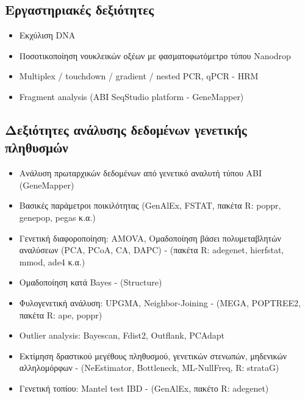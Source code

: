\documentclass[12pt,]{scrartcl}
\begin{document}

\subsection{Εργαστηριακές δεξιότητες}\label{lab}
\begin{itemize}
\vspace{-3mm}
\setlength\itemsep{-0.6em}
\item Εκχύλιση DNA%
\item Ποσοτικοποίηση νουκλεικών οξέων με φασματοφωτόμετρο τύπου Nanodrop
\item Multiplex / touchdown / gradient / nested PCR, qPCR - HRM
\item Fragment analysis (ABI SeqStudio platform - GeneMapper)
\end{itemize}


\subsection{Δεξιότητες ανάλυσης δεδομένων γενετικής πληθυσμών}\label{genetics}
\begin{itemize}
\vspace{-3mm}
\setlength\itemsep{-0.6em}
\item Ανάλυση πρωταρχικών δεδομένων από γενετικό αναλυτή τύπου ΑΒΙ (GeneMapper)
\item Βασικές παράμετροι ποικιλότητας (GenAlEx, FSTAT, πακέτα R: poppr, genepop, pegas κ.α.)
\item Γενετική διαφοροποίηση: AMOVA, Ομαδοποίηση βάσει πολυμεταβλητών αναλύσεων (PCA, PCoA, CA, DAPC) - (πακέτα R: adegenet, hierfstat, mmod, ade4 κ.α.)
\item Ομαδοποίηση κατά Bayes - (Structure)
\item Φυλογενετική ανάλυση: UPGMA, Neighbor-Joining - (MEGA, POPTREE2, πακέτα R: ape, poppr)
\item Outlier analysis: Bayescan, Fdist2, Outflank, PCAdapt
\item Εκτίμηση δραστικού μεγέθους πληθυσμού, γενετικών στενωπών, μηδενικών αλληλομόρφων - (NeEstimator, Bottleneck, ML-NullFreq, R: strataG)
\item Γενετική τοπίου: Mantel test IBD - (GenAlEx, πακέτο R: adegenet)

\end{itemize}
\end{document}
